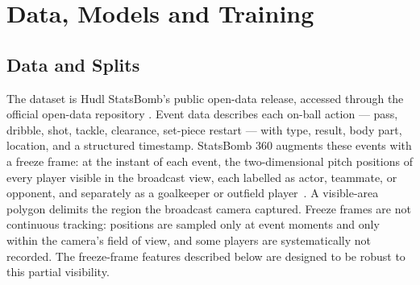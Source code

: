 \documentclass[runningheads]{llncs}
\begin{document}
\section{Data, Models and Training}
\subsection{Data and Splits}
The dataset is Hudl StatsBomb's public open-data release, accessed through the official open-data repository \cite{statsbomb2026opendata}. Event data describes each on-ball action --- pass, dribble, shot, tackle, clearance, set-piece restart --- with type, result, body part, location, and a structured timestamp. StatsBomb 360 augments these events with a freeze frame: at the instant of each event, the two-dimensional pitch positions of every player visible in the broadcast view, each labelled as actor, teammate, or opponent, and separately as a goalkeeper or outfield player~\cite{statsbomb2021freezeframe}. A visible-area polygon delimits the region the broadcast camera captured. Freeze frames are not continuous tracking: positions are sampled only at event moments and only within the camera's field of view, and some players are systematically not recorded. The freeze-frame features described below are designed to be robust to this partial visibility.
\end{document}
